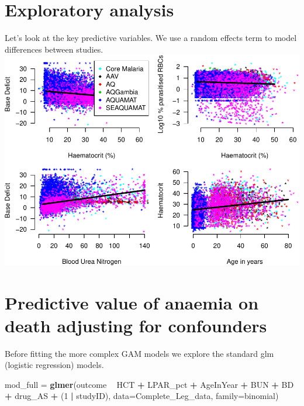 \documentclass[]{article}
\newenvironment{Shaded}{\begin{snugshade}}{\end{snugshade}}
\newcommand{\KeywordTok}[1]{\textcolor[rgb]{0.13,0.29,0.53}{\textbf{#1}}}
\newcommand{\DataTypeTok}[1]{\textcolor[rgb]{0.13,0.29,0.53}{#1}}
\newcommand{\DecValTok}[1]{\textcolor[rgb]{0.00,0.00,0.81}{#1}}
\newcommand{\StringTok}[1]{\textcolor[rgb]{0.31,0.60,0.02}{#1}}
\newcommand{\OperatorTok}[1]{\textcolor[rgb]{0.81,0.36,0.00}{\textbf{#1}}}
\newcommand{\NormalTok}[1]{#1}
\begin{document}
\section{Exploratory analysis}\label{exploratory-analysis}

Let's look at the key predictive variables. We use a random effects term
to model differences between studies.
\includegraphics{LegacyAnalysis_files/figure-latex/ExploratoryPlots-1.pdf}

\section{Predictive value of anaemia on death adjusting for
confounders}\label{predictive-value-of-anaemia-on-death-adjusting-for-confounders}

Before fitting the more complex GAM models we explore the standard glm
(logistic regression) models.

\begin{Shaded}
\begin{Highlighting}[]
\NormalTok{mod_full =}\StringTok{ }\KeywordTok{glmer}\NormalTok{(outcome }\OperatorTok{~}\StringTok{ }\NormalTok{HCT }\OperatorTok{+}\StringTok{ }\NormalTok{LPAR_pct }\OperatorTok{+}\StringTok{ }\NormalTok{AgeInYear }\OperatorTok{+}\StringTok{ }\NormalTok{BUN }\OperatorTok{+}\StringTok{ }\NormalTok{BD }\OperatorTok{+}\StringTok{ }\NormalTok{drug_AS }\OperatorTok{+}\StringTok{ }\NormalTok{(}\DecValTok{1} \OperatorTok{|}\StringTok{ }\NormalTok{studyID),}
               \DataTypeTok{data=}\NormalTok{Complete_Leg_data, }\DataTypeTok{family=}\NormalTok{binomial)}
\end{Highlighting}
\end{Shaded}
\end{document}

